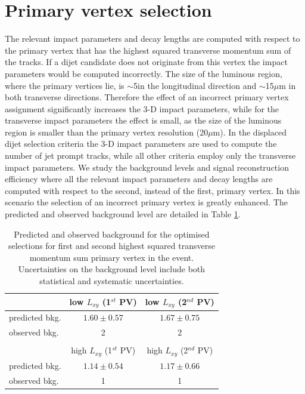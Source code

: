 \section{Primary vertex selection}
\label{subsec:pv}
The relevant impact parameters and decay lengths are computed 
with respect to the primary vertex that has the highest
squared transverse momentum sum of the tracks. If a dijet candidate does not originate from this vertex the impact
parameters would be computed incorrectly. The size of the luminous region, where the primary vertices lie,
 is $\sim$5\cm in the longitudinal direction and $\sim$15$\mu\text{m}$ in both transverse directions. 
Therefore the effect of an incorrect primary vertex assignment significantly increases the 3-D impact parameters,
 while for
the transverse impact parameters the effect is small, as the size of the luminous region is smaller than the 
primary vertex resolution (20$\mu\text{m}$).
In the displaced dijet selection criteria the 3-D impact parameters are used to compute 
the number of jet prompt tracks, while all other criteria employ
only the transverse impact parameters. 
 We study the background levels and signal reconstruction efficiency where all
 the relevant impact parameters and
decay lengths are computed with respect to the second, instead of the first, primary vertex. In this scenario 
the selection of an incorrect primary vertex is greatly enhanced. The predicted and
observed background level are detailed in Table \ref{tab:wrongvtx}.

\begin{table}[htbp]
\centering
\caption{Predicted and observed background for the optimised selections for first and second highest squared transverse momentum sum primary vertex in the event. Uncertainties on the background level include both statistical
and systematic uncertainties. \label{tab:wrongvtx}}
\vspace{0.1cm}
\begin{tabular}{lcc}
\\
 & low $L_{xy}$ (1$^{st}$ PV) & low $L_{xy}$ (2$^{nd}$ PV) \\
\hline
predicted bkg. & $1.60\pm0.57$ & $1.67\pm0.75$ \\
observed bkg. & 2 & 2 \\
\hline
\\
 &  high $L_{xy}$ (1$^{st}$ PV) & high $L_{xy}$ (2$^{nd}$ PV)\\
\hline
predicted bkg. & $1.14\pm0.54$ & $1.17\pm0.66$ \\
observed bkg. & 1 & 1 \\
\hline
\end{tabular}
\end{table}

